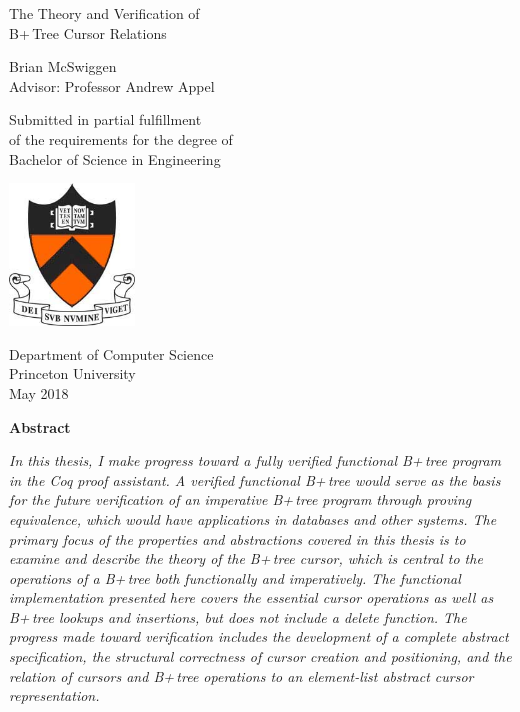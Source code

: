 \documentclass[12pt]{article}
\begin{document}
\doublespacing

\thispagestyle{empty}
\begin{sc}
\vspace*{0in}
\begin{center}
    \LARGE The Theory and Verification of\\B+\,Tree Cursor Relations
\end{center}
\vspace{.5in}
\begin{center}
    Brian McSwiggen\\
    Advisor: Professor Andrew Appel
\end{center}
\vspace{.5in}
\begin{center}
   Submitted in partial fulfillment\\
of the requirements for the degree of\\
Bachelor of Science in Engineering

\includegraphics[width=0.25\textwidth]{logo.jpg}

Department of Computer Science\\
Princeton University\\
May 2018
\end{center}
\end{sc}

\clearpage
{}

\begin{center}
    \LARGE \textbf{Abstract}
\end{center}

\textit{In this thesis, I make progress toward a fully verified functional B+\,tree program in the Coq proof assistant. A verified functional B+\,tree would serve as the basis for the future verification of an imperative B+\,tree program through proving equivalence, which would have applications in databases and other systems. The primary focus of the properties and abstractions covered in this thesis is to examine and describe the theory of the B+\,tree cursor, which is central to the operations of a B+\,tree both functionally and imperatively. The functional implementation presented here covers the essential cursor operations as well as B+\,tree lookups and insertions, but does not include a delete function. The progress made toward verification includes the development of a complete abstract specification, the structural correctness of cursor creation and positioning, and the relation of cursors and B+\,tree operations to an element-list abstract cursor representation.}
\end{document}
